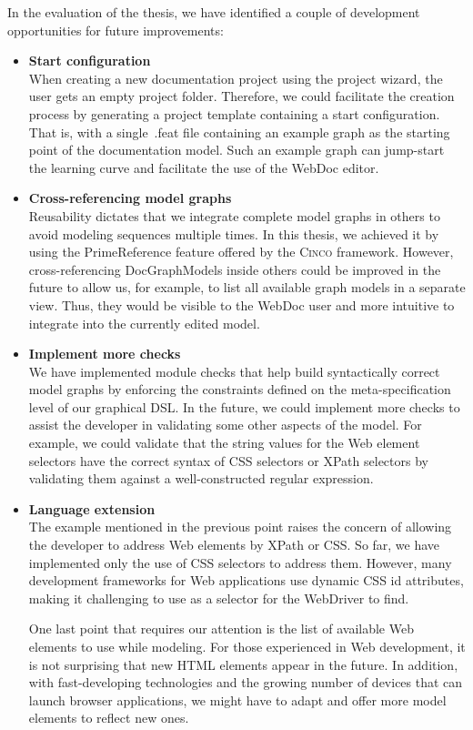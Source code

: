 In the evaluation of the thesis, we have identified a couple of development opportunities for future improvements:
\begin{itemize}
    \item \textbf{Start configuration}\\
        When creating a new documentation project using the project wizard, the user gets an empty project folder. Therefore, we could facilitate the creation process by generating a project template containing a start configuration. That is, with a single~.feat file containing an example graph as the starting point of the documentation model. Such an example graph can jump-start the learning curve and facilitate the use of the WebDoc editor.
    \item \textbf{Cross-referencing model graphs}\\
        Reusability dictates that we integrate complete model graphs in others to avoid modeling sequences multiple times. In this thesis, we achieved it by using the PrimeReference feature offered by the \textsc{Cinco} framework. However, cross-referencing DocGraphModels inside others could be improved in the future to allow us, for example, to list all available graph models in a separate view. Thus, they would be visible to the WebDoc user and more intuitive to integrate into the currently edited model.
    \item \textbf{Implement more checks}\\
        We have implemented module checks that help build syntactically correct model graphs by enforcing the constraints defined on the meta-specification level of our graphical DSL. In the future, we could implement more checks to assist the developer in validating some other aspects of the model. For example, we could validate that the string values for the Web element selectors have the correct syntax of CSS selectors or XPath selectors by validating them against a well-constructed regular expression.
    \item \textbf{Language extension}\\
        The example mentioned in the previous point raises the concern of allowing the developer to address Web elements by XPath or CSS\@. So far, we have implemented only the use of CSS selectors to address them. However, many development frameworks for Web applications use dynamic CSS id attributes, making it challenging to use as a selector for the WebDriver to find. 

        One last point that requires our attention is the list of available Web elements to use while modeling. For those experienced in Web development, it is not surprising that new HTML elements appear in the future. In addition, with fast-developing technologies and the growing number of devices that can launch browser applications, we might have to adapt and offer more model elements to reflect new ones.
\end{itemize}
